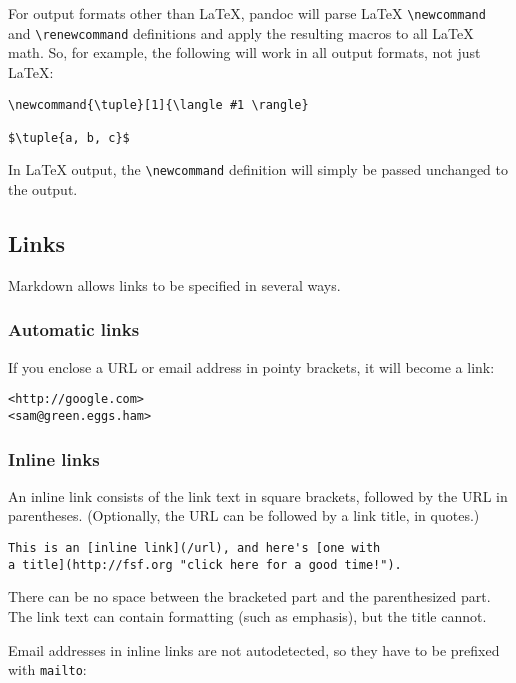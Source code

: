 \documentclass[]{article}
\begin{document}
For output formats other than LaTeX, pandoc will parse LaTeX
\texttt{\textbackslash{}newcommand} and
\texttt{\textbackslash{}renewcommand} definitions and apply the
resulting macros to all LaTeX math. So, for example, the following will
work in all output formats, not just LaTeX:

\begin{verbatim}
\newcommand{\tuple}[1]{\langle #1 \rangle}

$\tuple{a, b, c}$
\end{verbatim}

In LaTeX output, the \texttt{\textbackslash{}newcommand} definition will
simply be passed unchanged to the output.

\subsection{Links}\label{links}

Markdown allows links to be specified in several ways.

\subsubsection{Automatic links}\label{automatic-links}

If you enclose a URL or email address in pointy brackets, it will become
a link:

\begin{verbatim}
<http://google.com>
<sam@green.eggs.ham>
\end{verbatim}

\subsubsection{Inline links}\label{inline-links}

An inline link consists of the link text in square brackets, followed by
the URL in parentheses. (Optionally, the URL can be followed by a link
title, in quotes.)

\begin{verbatim}
This is an [inline link](/url), and here's [one with
a title](http://fsf.org "click here for a good time!").
\end{verbatim}

There can be no space between the bracketed part and the parenthesized
part. The link text can contain formatting (such as emphasis), but the
title cannot.

Email addresses in inline links are not autodetected, so they have to be
prefixed with \texttt{mailto}:
\end{document}
